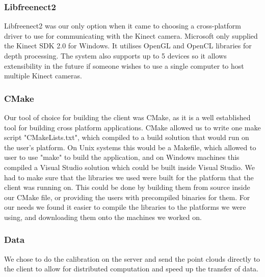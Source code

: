 \documentclass{article}
\begin{document}
\subsubsection{Libfreenect2}
Libfreenect2 was our only option when it came to choosing a cross-platform driver to use for communicating with the Kinect camera. Microsoft only supplied the Kinect SDK 2.0 for Windows. It utilises OpenGL and OpenCL libraries for depth processing. The system also supports up to 5 devices so it allows extensibility in the future if someone wishes to use a single computer to host multiple Kinect cameras.
\subsubsection{CMake}
Our tool of choice for building the client was CMake, as it is a well established tool for building cross platform applications. CMake allowed us to write one make script "CMakeLists.txt", which compiled to a build solution that would run on the user's platform. On Unix systems this would be a Makefile, which allowed to user to use "make" to build the application, and on Windows machines this compiled a Visual Studio solution which could be built inside Visual Studio. We had to make sure that the libraries we used were built for the platform that the client was running on. This could be done by building them from source inside our CMake file, or providing the users with precompiled binaries for them. For our needs we found it easier to compile the libraries to the platforms we were using, and downloading them onto the machines we worked on. 
\subsubsection{Data}
We chose to do the calibration on the server and send the point clouds directly to the client to allow for distributed computation and speed up the transfer of data.
\newpage
\end{document}
